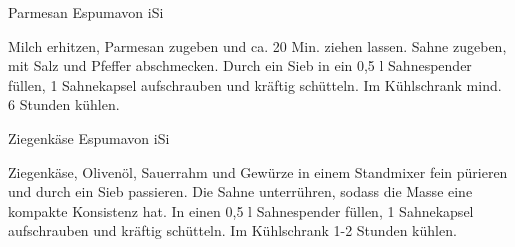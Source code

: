 \begin{recipe}{Parmesan Espuma}{von iSi}
  \label{Parmesan Espuma}
  \inglist
  

  \steps
  Milch erhitzen, Parmesan zugeben und ca. 20 Min. ziehen lassen. Sahne
  zugeben, mit Salz und Pfeffer abschmecken. Durch ein Sieb in ein 0,5 l
  Sahnespender füllen, 1 Sahnekapsel aufschrauben und kräftig schütteln.  Im
  Kühlschrank mind. 6 Stunden kühlen.

\end{recipe}

\begin{recipe}{Ziegenkäse Espuma}{von iSi}
  \label{Ziegenkäse Espuma}
  \inglist


  \steps
  Ziegenkäse, Olivenöl, Sauerrahm und Gewürze in einem Standmixer fein pürieren
  und durch ein Sieb passieren. Die Sahne unterrühren, sodass die Masse eine
  kompakte Konsistenz hat. In einen 0,5 l Sahnespender füllen, 1 Sahnekapsel
  aufschrauben und kräftig schütteln. Im Kühlschrank 1-2 Stunden kühlen. 

\end{recipe}
